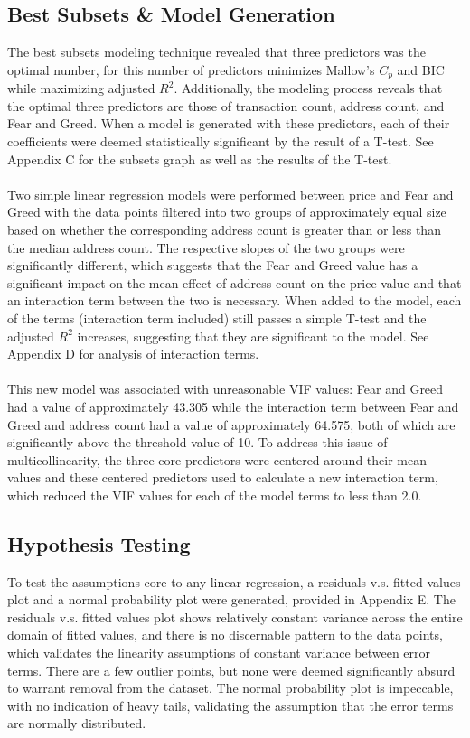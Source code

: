 \documentclass{article}
\begin{document}
\subsection{Best Subsets \& Model Generation}
The best subsets modeling technique revealed that three predictors was the optimal number, for this number of predictors minimizes Mallow's $C_p$ and BIC while maximizing adjusted $R^2$. Additionally, the modeling process reveals that the optimal three predictors are those of transaction count, address count, and Fear and Greed. When a model is generated with these predictors, each of their coefficients were deemed statistically significant by the result of a T-test. See Appendix C for the subsets graph as well as the results of the T-test. \\~\\
Two simple linear regression models were performed between price and Fear and Greed with the data points filtered into two groups of approximately equal size based on whether the corresponding address count is greater than or less than the median address count. The respective slopes of the two groups were significantly different, which suggests that the Fear and Greed value has a significant impact on the mean effect of address count on the price value and that an interaction term between the two is necessary. When added to the model, each of the terms (interaction term included) still passes a simple T-test and the adjusted $R^2$ increases, suggesting that they are significant to the model. See Appendix D for analysis of interaction terms. \\~\\
This new model was associated with unreasonable VIF values: Fear and Greed had a value of approximately 43.305 while the interaction term between Fear and Greed and address count had a value of approximately 64.575, both of which are significantly above the threshold value of 10. To address this issue of multicollinearity, the three core predictors were centered around their mean values and these centered predictors used to calculate a new interaction term, which reduced the VIF values for each of the model terms to less than 2.0.

\subsection{Hypothesis Testing}
To test the assumptions core to any linear regression, a residuals v.s. fitted values plot and a normal probability plot were generated, provided in Appendix E. The residuals v.s. fitted values plot shows relatively constant variance across the entire domain of fitted values, and there is no discernable pattern to the data points, which validates the linearity assumptions of constant variance between error terms. There are a few outlier points, but none were deemed significantly absurd to warrant removal from the dataset. The normal probability plot is impeccable, with no indication of heavy tails, validating the assumption that the error terms are normally distributed.
\end{document}
